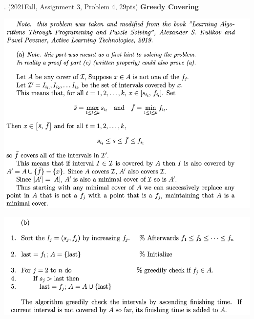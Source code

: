 \begin{spacing}{1.3}
    . (2021Fall, Assignment 3, Problem 4, 29pts) {\bf Greedy Covering} 

    \includegraphics[scale=1.05]{images/07-exercise-2021f-hw-sol1}

    \includegraphics[scale=1.05]{images/07-exercise-2021f-hw-sol2}


\end{spacing}

